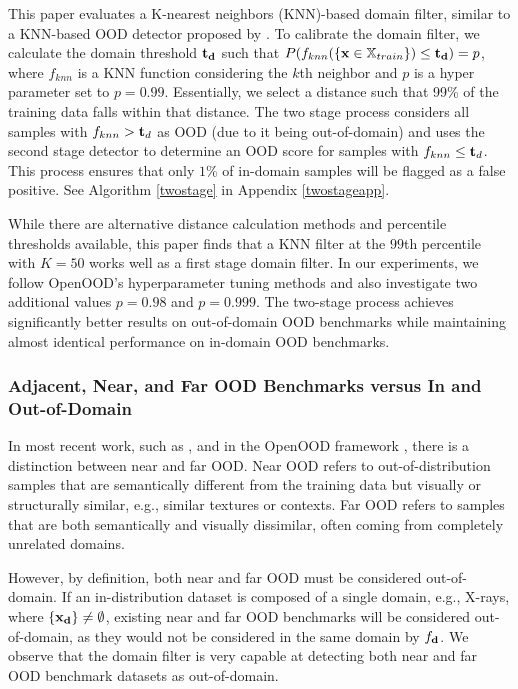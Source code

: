 \documentclass[letterpaper]{article} %
\theoremstyle{plain}
\theoremstyle{definition}
\theoremstyle{remark}
\begin{document}
This paper evaluates a K-nearest neighbors (KNN)-based domain filter, similar to a KNN-based OOD detector proposed by \cite{sun2022out}. To calibrate the domain filter, we calculate the domain threshold ${\mathbf{t}}_{\mathbf{d}}$ such that $P(f_{knn}(\{{\mathbf{x}} \in {\mathbb{X}}_{train}\}) \leq {\mathbf{t}}_{\mathbf{d}}) = p$, where $f_{knn}$ is a KNN function considering the $k$th neighbor and $p$ is a hyper parameter set to $p = 0.99$. Essentially, we select a distance such that 99\% of the training data falls within that distance. The two stage process considers all samples with $f_{knn} > {\mathbf{t}}_d$ as OOD (due to it being out-of-domain) and uses the second stage detector to determine an OOD score for samples with  $f_{knn} \leq {\mathbf{t}}_d$. This process ensures that only $1\%$ of in-domain samples will be flagged as a false positive. See Algorithm \ref{twostage} in Appendix \ref{twostageapp}.

While there are alternative distance calculation methods and percentile thresholds available, this paper finds that a KNN filter at the $99$th percentile with $K = 50$ works well as a first stage domain filter. In our experiments, we follow OpenOOD's hyperparameter tuning methods and also investigate two additional values $p = 0.98$ and $p = 0.999$. The two-stage process achieves significantly better results on out-of-domain OOD benchmarks while maintaining almost identical performance on in-domain OOD benchmarks. 

\subsubsection{Adjacent, Near, and Far OOD Benchmarks versus In and Out-of-Domain}
\label{adjacentnearfar}

In most recent work, such as \cite{fort2021exploring}, and in the OpenOOD framework \cite{yang2022openood, zhang2023openood}, there is a distinction between near and far OOD. Near OOD refers to out-of-distribution samples that are semantically different from the training data but visually or structurally similar, e.g., similar textures or contexts. Far OOD refers to samples that are both semantically and visually dissimilar, often coming from completely unrelated domains. 

However, by definition, both near and far OOD must be considered out-of-domain. If an in-distribution dataset is composed of a single domain, e.g., X-rays, where $\{{\mathbf{x}}_{\mathbf{d}}\} \neq \emptyset$, existing near and far OOD benchmarks will be considered out-of-domain, as they would not be considered in the same domain by $f_{\mathbf{d}}$. We observe that the domain filter is very capable at detecting both near and far OOD benchmark datasets as out-of-domain. 
\end{document}
